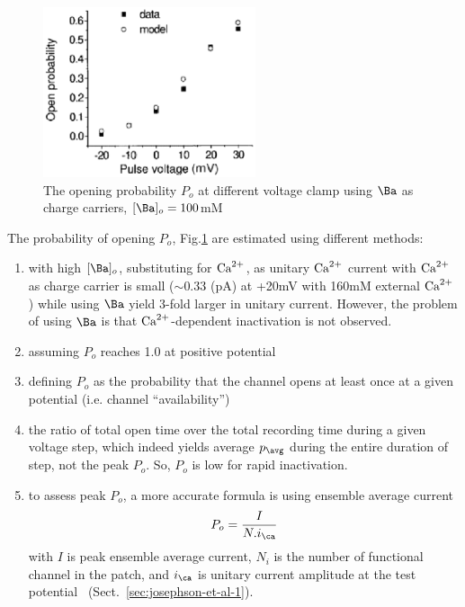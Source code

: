 \begin{figure}[hbt]
  \centerline{\includegraphics[height=5cm,
    angle=0]{./images/LCC_Po_Sun2000.eps}}
  \caption{The opening probability $P_o$ at different voltage clamp using $\Ba$
  as charge carriers, $[\Ba]_o=100$mM \citep{sun2000mlc}}
  \label{fig:LCC_Po}
\end{figure}

The probability of opening $P_o$, Fig.\ref{fig:LCC_Po} are estimated using
different methods:
\begin{enumerate}
\item with high $[\Ba]_o$, substituting for ${\text{Ca}^{2+}}$, as unitary ${\text{Ca}^{2+}}$ current
with ${\text{Ca}^{2+}}$ as charge carrier is small ($\sim 0.33$ (pA) at +20mV with 160mM
external ${\text{Ca}^{2+}}$ \citep{yue1990}) while using $\Ba$ yield 3-fold larger in unitary
current\citep{imredy1994mcs}. However, the problem of using $\Ba$ is that
${\text{Ca}^{2+}}$-dependent inactivation is not observed.

\item assuming $P_o$ reaches 1.0 at positive potential

\item defining $P_o$ as the probability that the channel opens at
  least once at a given potential (i.e. channel ``availability'')

\item the ratio of total open time over the total recording time
  during a given voltage step, which indeed yields average $p_\avg$
  during the entire duration of step, not the peak $P_o$. So, $P_o$ is
  low for rapid inactivation.
\item to assess peak $P_o$, a more accurate formula is using ensemble
  average current
  \begin{equation}
    \label{eq:1423}
    P_o = \frac{I}{N.i_\ca}
  \end{equation}
  with $I$ is peak ensemble average current, $N_i$ is the number of
  functional channel in the patch, and $i_\ca$ is unitary current
  amplitude at the test potential~\citep{josephson2010pgp}
  (Sect.~\ref{sec:josephson-et-al-1}).
\end{enumerate}

